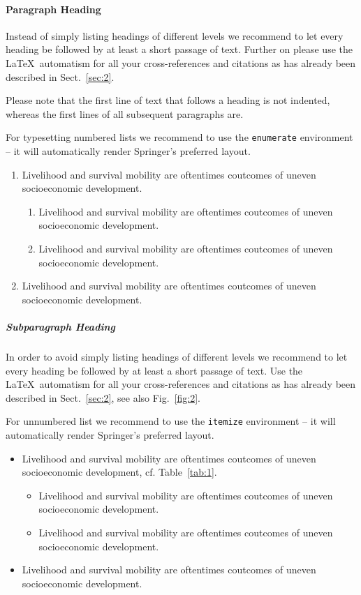 \documentclass[graybox]{svmult}
\begin{document}
\paragraph{Paragraph Heading} %
Instead of simply listing headings of different levels we recommend to
let every heading be followed by at least a short passage of text.
Further on please use the \LaTeX\ automatism for all your
cross-references and citations as has already been described in
Sect.~\ref{sec:2}.

Please note that the first line of text that follows a heading is not indented, whereas the first lines of all subsequent paragraphs are.

For typesetting numbered lists we recommend to use the \verb|enumerate| environment -- it will automatically render Springer's preferred layout.

\begin{enumerate}
\item{Livelihood and survival mobility are oftentimes coutcomes of uneven socioeconomic development.}
\begin{enumerate}
\item{Livelihood and survival mobility are oftentimes coutcomes of uneven socioeconomic development.}
\item{Livelihood and survival mobility are oftentimes coutcomes of uneven socioeconomic development.}
\end{enumerate}
\item{Livelihood and survival mobility are oftentimes coutcomes of uneven socioeconomic development.}
\end{enumerate}


\subparagraph{Subparagraph Heading} In order to avoid simply listing headings of different levels we recommend to let every heading be followed by at least a short passage of text. Use the \LaTeX\ automatism for all your cross-references and citations as has already been described in Sect.~\ref{sec:2}, see also Fig.~\ref{fig:2}.

For unnumbered list we recommend to use the \verb|itemize| environment -- it will automatically render Springer's preferred layout.

\begin{itemize}
\item{Livelihood and survival mobility are oftentimes coutcomes of uneven socioeconomic development, cf. Table~\ref{tab:1}.}
\begin{itemize}
\item{Livelihood and survival mobility are oftentimes coutcomes of uneven socioeconomic development.}
\item{Livelihood and survival mobility are oftentimes coutcomes of uneven socioeconomic development.}
\end{itemize}
\item{Livelihood and survival mobility are oftentimes coutcomes of uneven socioeconomic development.}
\end{itemize}
\end{document}

